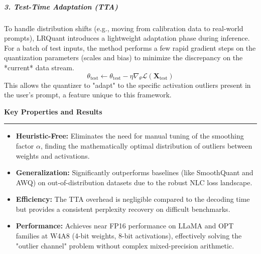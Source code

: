 \documentclass[11pt,a4paper]{article}
\newcommand{\problemp}[1]{%
  \par\medskip
  {\noindent\bfseries\normalsize\color{signcol}#1\par}%
  \vspace{0.4ex}%
  {\noindent\color{softgray}\rule{\linewidth}{0.6pt}\par}%
  \vspace{0.8ex}%
}
\theoremstyle{definition}
\begin{document}
\subparagraph{3. Test-Time Adaptation (TTA)}
To handle distribution shifts (e.g., moving from calibration data to real-world prompts), LRQuant introduces a lightweight adaptation phase during inference. For a batch of test inputs, the method performs a few rapid gradient steps on the quantization parameters (scales and bias) to minimize the discrepancy on the *current* data stream.
\begin{equation}
    \theta_{\text{test}} \leftarrow \theta_{\text{test}} - \eta \nabla_{\theta} \mathcal{L}(\bm{X}_{\text{test}})
\end{equation}
This allows the quantizer to "adapt" to the specific activation outliers present in the user's prompt, a feature unique to this framework.

\problemp{Key Properties and Results}
\begin{itemize}
    \item \textbf{Heuristic-Free:} Eliminates the need for manual tuning of the smoothing factor $\alpha$, finding the mathematically optimal distribution of outliers between weights and activations.
    \item \textbf{Generalization:} Significantly outperforms baselines (like SmoothQuant and AWQ) on out-of-distribution datasets due to the robust NLC loss landscape.
    \item \textbf{Efficiency:} The TTA overhead is negligible compared to the decoding time but provides a consistent perplexity recovery on difficult benchmarks.
    \item \textbf{Performance:} Achieves near FP16 performance on LLaMA and OPT families at W4A8 (4-bit weights, 8-bit activations), effectively solving the "outlier channel" problem without complex mixed-precision arithmetic.
\end{itemize}


\newpage


\end{document}
